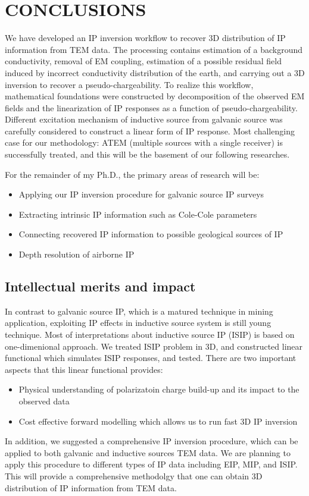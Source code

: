 \documentclass[letterpaper,11pt]{article}
\begin{document}
\section{CONCLUSIONS}
We have developed an IP inversion workflow to recover 3D distribution of IP information from TEM data. The processing contains estimation of a background conductivity, removal of EM coupling, estimation of a possible residual field induced by incorrect conductivity distribution of the earth, and carrying out a 3D inversion to recover a pseudo-chargeability. To realize this workflow, mathematical foundations were constructed by decomposition of the observed EM fields and the linearization of IP responses as a function of pseudo-chargeability. Different excitation mechanism of inductive source from galvanic source was carefully considered to construct a linear form of IP response. Most challenging case for our methodology: ATEM (multiple sources with a single receiver) is successfully treated, and this will be the basement of our following researches. 

For the remainder of my Ph.D., the primary areas of research will be:
\begin{itemize}
  \item Applying our IP inversion procedure for galvanic source IP surveys
  \item Extracting intrinsic IP information such as Cole-Cole parameters
  \item Connecting recovered IP information to possible geological sources of IP
  \item Depth resolution of airborne IP
\end{itemize}

\subsection{Intellectual merits and impact}
In contrast to galvanic source IP, which is a matured technique in mining application, exploiting IP effects in inductive source system is still young technique. Most of interpretations about inductive source IP (ISIP) is based on one-dimenional approach. We treated ISIP problem in 3D, and constructed linear functional which simulates ISIP responses, and tested. There are two important aspects that this linear functional provides:
\begin{itemize}
  \item Physical understanding of polarizatoin charge build-up and its impact to the observed data
  \item Cost effective forward modelling which allows us to run fast 3D IP inversion
\end{itemize}
In addition,  we suggested a comprehensive IP inversion procedure, which can be applied to both galvanic and inductive sources TEM data. We are planning to apply this procedure to different types of IP data including EIP, MIP, and ISIP. This will provide a comprehensive methodolgy that one can obtain 3D distribution of IP information from TEM data.
\end{document}
